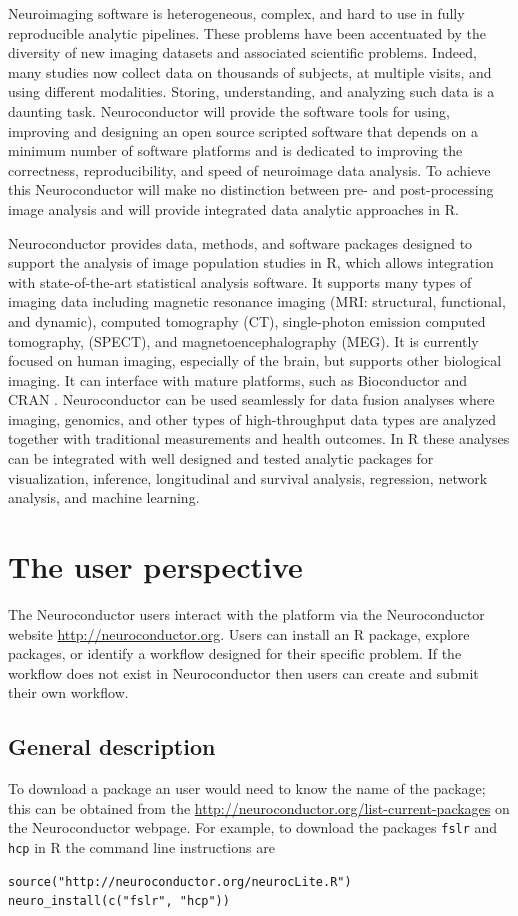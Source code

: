 \documentclass[]{elsarticle} %
\begin{document}
Neuroimaging software is heterogeneous, complex, and hard to use in fully reproducible analytic pipelines. These problems have been accentuated by the diversity of new imaging datasets and associated scientific problems. Indeed, many studies now collect data on thousands of subjects, at multiple visits, and using different modalities. Storing, understanding, and analyzing such data is a daunting task.  Neuroconductor will provide the software tools for using, improving and designing an open source scripted software that depends on a minimum number of software platforms and is dedicated to improving the correctness, reproducibility, and speed of neuroimage data analysis. To achieve this Neuroconductor will make no distinction between pre- and post-processing image analysis and will provide integrated data analytic approaches in R.


Neuroconductor provides data, methods, and software packages designed to support the analysis of image population studies in R, which allows integration with state-of-the-art statistical analysis software. It supports many types of imaging data including magnetic resonance imaging (MRI: structural, functional, and dynamic), computed tomography (CT), single-photon emission computed tomography, (SPECT), and magnetoencephalography (MEG). It is currently focused on human imaging, especially of the brain, but supports other biological imaging.  It can interface with mature platforms, such as Bioconductor \cite{bioc1,bioc2} and CRAN \cite{Hornik2016,r}. Neuroconductor can be used seamlessly for data fusion analyses where imaging, genomics, and other types of high-throughput data types are analyzed together with traditional measurements and health outcomes. In R these analyses can be integrated with well designed and tested analytic packages for visualization, inference, longitudinal and survival analysis, regression, network analysis, and machine learning.


\section{The user perspective}\label{section:user_perspective}
The Neuroconductor users interact with the platform via the Neuroconductor website \url{http://neuroconductor.org}. Users can install an R package, explore packages, or identify a workflow designed for their specific problem. If the workflow does not exist in Neuroconductor then users can create and submit their own workflow. 


\subsection{General description}\label{subsec:general_description}
To download a package an user would need to know the name of the package; this can be obtained from the \href{list of packages}{http://neuroconductor.org/list-current-packages} on the Neuroconductor webpage. For example, to download the packages \verb"fslr" and \verb"hcp" in R the command line instructions are 
\color{blue}
\begin{verbatim}
source("http://neuroconductor.org/neurocLite.R") 
neuro_install(c("fslr", "hcp"))
\end{verbatim}
\color{black}
\end{document}
